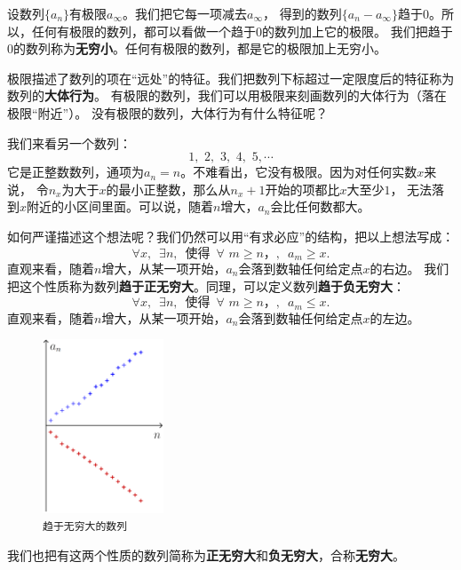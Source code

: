 \documentclass[12pt,UTF8]{ctexbook}
\begin{document}
设数列$\{a_n\}$有极限$a_\infty$。我们把它每一项减去$a_\infty$，
得到的数列$\{a_n - a_\infty\}$趋于$0$。所以，任何有极限的数列，都可以看做一个趋于$0$的数列加上它的极限。
我们把趋于$0$的数列称为\textbf{无穷小}。任何有极限的数列，都是它的极限加上无穷小。

极限描述了数列的项在“远处”的特征。我们把数列下标超过一定限度后的特征称为数列的\textbf{大体行为}。
有极限的数列，我们可以用极限来刻画数列的大体行为（落在极限“附近”）。
没有极限的数列，大体行为有什么特征呢？

我们来看另一个数列：
$$ 1,\,\,2,\,\,3,\,\,4,\,\,5,\cdots $$
它是正整数数列，通项为$a_n = n$。不难看出，它没有极限。因为对任何实数$x$来说，
令$n_x$为大于$x$的最小正整数，那么从$n_x+1$开始的项都比$x$大至少$1$，
无法落到$x$附近的小区间里面。可以说，随着$n$增大，$a_n$会比任何数都大。

如何严谨描述这个想法呢？我们仍然可以用“有求必应”的结构，把以上想法写成：
$$ \forall x, \,\,\, \exists n, \,\,\,\mbox{使得} \,\,\,\forall \,\, m \geqslant n，,\,\,\, a_m \geqslant x.$$
直观来看，随着$n$增大，从某一项开始，$a_n$会落到数轴任何给定点$x$的右边。
我们把这个性质称为数列\textbf{趋于正无穷大}。同理，可以定义数列\textbf{趋于负无穷大}：
$$\forall x, \,\,\, \exists n, \,\,\,\mbox{使得}\,\,\,\forall \,\, m \geqslant n，,\,\,\, a_m \leqslant x.$$
直观来看，随着$n$增大，从某一项开始，$a_n$会落到数轴任何给定点$x$的左边。

\begin{figure} %
    \vspace{-48pt}
    \flushright
    \includegraphics[width=0.32\textwidth]{数列无穷大1.png}
    \caption*{\texttt{趋于无穷大的数列}}
\end{figure}

我们也把有这两个性质的数列简称为\textbf{正无穷大}和\textbf{负无穷大}，合称\textbf{无穷大}。
\end{document}
